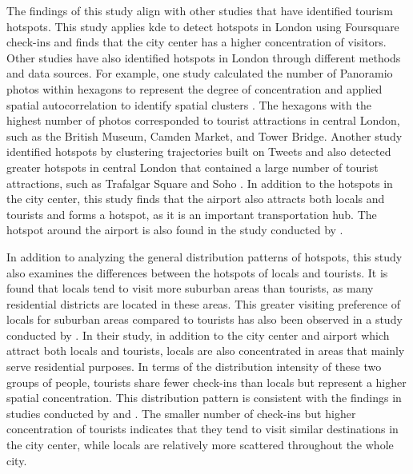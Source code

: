 \documentclass{article}
\theoremstyle{remark}
\begin{document}
The findings of this study align with other studies that have identified tourism hotspots. This study applies \acrshort{kde} to detect hotspots in London using Foursquare check-ins and finds that the city center has a higher concentration of visitors. Other studies have also identified hotspots in London through different methods and data sources. For example, one study calculated the number of Panoramio photos within hexagons to represent the degree of concentration and applied spatial autocorrelation to identify spatial clusters \citep{garcia-palomares_identification_2015}. The hexagons with the highest number of photos corresponded to tourist attractions in central London, such as the British Museum, Camden Market, and Tower Bridge. Another study identified hotspots by clustering trajectories built on Tweets and also detected greater hotspots in central London that contained a large number of tourist attractions, such as Trafalgar Square and Soho  \citep{ma_exploring_2020}. In addition to the hotspots in the city center, this study finds that the airport also attracts both locals and tourists and forms a hotspot, as it is an important transportation hub. The hotspot around the airport is also found in the study conducted by \cite{su_analysing_2020}.

In addition to analyzing the general distribution patterns of hotspots, this study also examines the differences between the hotspots of locals and tourists. It is found that locals tend to visit more suburban areas than tourists, as many residential districts are located in these areas. This greater visiting preference of locals for suburban areas compared to tourists has also been observed in a study conducted by \cite{su_analysing_2020}. In their study, in addition to the city center and airport which attract both locals and tourists, locals are also concentrated in areas that mainly serve residential purposes. In terms of the distribution intensity of these two groups of people, tourists share fewer check-ins than locals but represent a higher spatial concentration. This distribution pattern is consistent with the findings in studies conducted by \cite{garcia-palomares_identification_2015} and \cite{su_analysing_2020}. The smaller number of check-ins but higher concentration of tourists indicates that they tend to visit similar destinations in the city center, while locals are relatively more scattered throughout the whole city.
\end{document}
